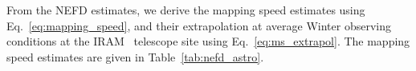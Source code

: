 
From the NEFD estimates, we derive the mapping speed estimates using
Eq.~\ref{eq:mapping_speed}, and their extrapolation at average Winter
observing conditions at the IRAM \trentemetre\ telescope site using
Eq.~\ref{eq:ms_extrapol}. The mapping speed estimates are given in
Table~\ref{tab:nefd_astro}.


